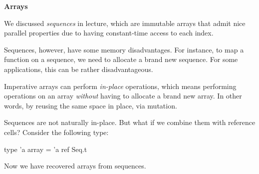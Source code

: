 
\textbf{Arrays}

We discussed \textit{sequences} in lecture, which are immutable arrays that
admit nice parallel properties due to having constant-time access to each
index.

Sequences, however, have some memory disadvantages. For instance, to map a function
on a sequence, we need to allocate a brand new sequence. For some applications,
this can be rather disadvantageous.

Imperative arrays can perform \textit{in-place} operations, which means performing
operations on an array \textit{without} having to allocate a brand new array. In
other words, by reusing the same space in place, via mutation.

Sequences are not naturally in-place. But what if we combine them with reference
cells? Consider the following type:

\begin{codeblock}
  type 'a array = 'a ref Seq.t
\end{codeblock}

Now we have recovered arrays from sequences.

